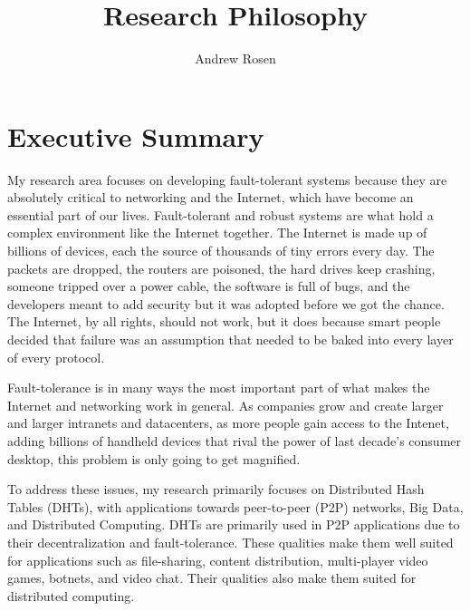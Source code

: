 \documentclass[letterpaper]{article}
\author{Andrew Rosen}
\title{Research Philosophy}
\date{}
\begin{document}
\maketitle



\section{Executive Summary}




My research area focuses on developing fault-tolerant systems because they are absolutely critical to networking and the Internet, which have become an essential part of our lives.
Fault-tolerant and robust systems are what hold a complex environment like the Internet together.
The Internet is made up of billions of devices, each the source of thousands of tiny errors every day.
The packets are dropped, the routers are poisoned, the hard drives keep crashing, someone tripped over a power cable, the software is full of bugs, and the developers meant to add security but it was adopted before we got the chance.
The Internet, by all rights, should not work, but it does because smart people decided that failure was an assumption that needed to be baked into every layer of every protocol.

Fault-tolerance is in many ways the most important part of what makes the Internet and networking work in general.
As companies grow and create larger and larger intranets and datacenters, as more people gain access to the Intenet, adding billions of handheld devices that rival the power of last decade's consumer desktop, this problem is only going to get magnified.

To address these issues, my research primarily focuses on Distributed Hash Tables (DHTs), with applications towards peer-to-peer (P2P) networks, Big Data, and Distributed Computing.
DHTs are primarily used in P2P applications due to their decentralization and fault-tolerance. 
These qualities make them well suited for applications such as file-sharing, content distribution, multi-player video games, botnets, and video chat.
Their qualities also make them suited for distributed computing.
\end{document}
